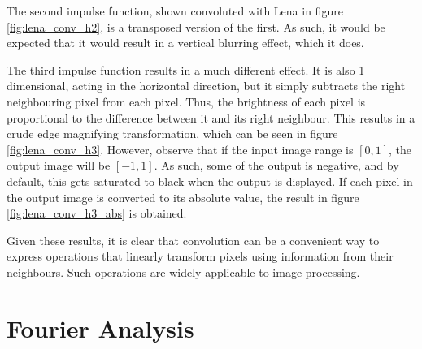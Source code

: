\documentclass{sydeStyle}
\begin{document}
The second impulse function, shown convoluted with Lena in figure
\ref{fig:lena_conv_h2}, is a transposed version of the first.  As such, it would
be expected that it would result in a vertical blurring effect, which it does.

The third impulse function results in a much different effect.
It is also 1 dimensional, acting in the horizontal direction, but it simply
subtracts the right neighbouring pixel from each pixel.
Thus, the brightness of each pixel is proportional to the difference between it
and its right neighbour.
This results in a crude edge magnifying transformation, which can be seen in
figure \ref{fig:lena_conv_h3}.
However, observe that if the input image range is $[0,1]$, the output image will
be $[-1,1]$.
As such, some of the output is negative, and by default, this gets saturated to
black when the output is displayed.
If each pixel in the output image is converted to its absolute value, the result
in figure \ref{fig:lena_conv_h3_abs} is obtained.

Given these results, it is clear that convolution can be a convenient way to
express operations that linearly transform pixels using information from their
neighbours.
Such operations are widely applicable to image processing.

\section*{Fourier Analysis}





\end{document}
